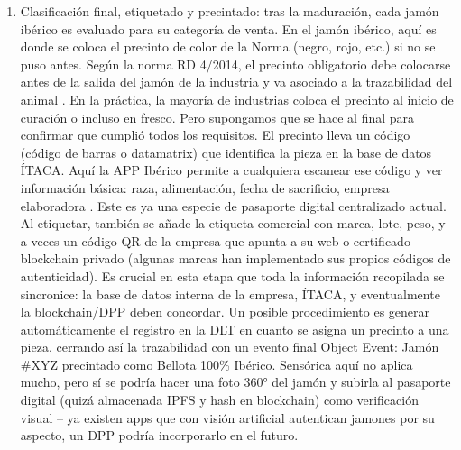\begin{enumerate}
    \item Clasificación final, etiquetado y precintado: tras la maduración, cada jamón ibérico es evaluado para su categoría de venta. En el jamón ibérico, aquí es donde se coloca el precinto de color de la Norma (negro, rojo, etc.) si no se puso antes. Según la norma RD 4/2014, el precinto obligatorio debe colocarse antes de la salida del jamón de la industria y va asociado a la trazabilidad del animal \cite{ministerio_de_agricultura_alimentacion_y_medio_ambiente_real_2014}. En la práctica, la mayoría de industrias coloca el precinto al inicio de curación o incluso en fresco. Pero supongamos que se hace al final para confirmar que cumplió todos los requisitos. El precinto lleva un código (código de barras o datamatrix) que identifica la pieza en la base de datos ÍTACA. Aquí la APP Ibérico permite a cualquiera escanear ese código y ver información básica: raza, alimentación, fecha de sacrificio, empresa elaboradora \cite{noauthor_app_nodate}. Este es ya una especie de pasaporte digital centralizado actual. Al etiquetar, también se añade la etiqueta comercial con marca, lote, peso, y a veces un código QR de la empresa que apunta a su web o certificado blockchain privado (algunas marcas han implementado sus propios códigos de autenticidad). Es crucial en esta etapa que toda la información recopilada se sincronice: la base de datos interna de la empresa, ÍTACA, y eventualmente la blockchain/DPP deben concordar. Un posible procedimiento es generar automáticamente el registro en la DLT en cuanto se asigna un precinto a una pieza, cerrando así la trazabilidad con un evento final Object Event: Jamón \#XYZ precintado como Bellota 100\% Ibérico. Sensórica aquí no aplica mucho, pero sí se podría hacer una foto 360° del jamón y subirla al pasaporte digital (quizá almacenada IPFS y hash en blockchain) como verificación visual – ya existen apps que con visión artificial autentican jamones por su aspecto, un DPP podría incorporarlo en el futuro.

\end{enumerate}
